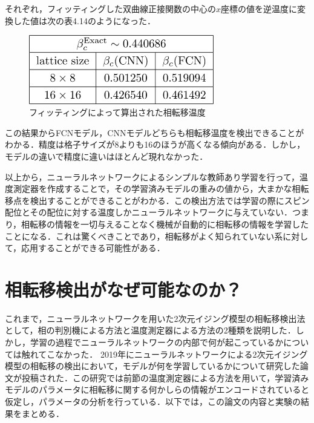\documentclass[a4paper,11pt]{jsreport}
\begin{document}
それぞれ，フィッティングした双曲線正接関数の中心の$x$座標の値を逆温度に変換した値は次の表4.14のようになった．
\begin{figure}[H]
   \begin{center}
       \includegraphics[height=3cm]{image/温度測定器検出結果.png}
       \caption{フィッティングによって算出された相転移温度}
   \end{center}
\end{figure}
この結果からFCNモデル，CNNモデルどちらも相転移温度を検出できることがわかる．精度は格子サイズが8よりも16のほうが高くなる傾向がある．しかし，モデルの違いで精度に違いはほとんど現れなかった．\par
以上から，ニューラルネットワークによるシンプルな教師あり学習を行って，温度測定器を作成することで，その学習済みモデルの重みの値から，大まかな相転移点を検出することができることがわかる．この検出方法では学習の際にスピン配位とその配位に対する温度しかニューラルネットワークに与えていない．つまり，相転移の情報を一切与えることなく機械が自動的に相転移の情報を学習したことになる．これは驚くべきことであり，相転移がよく知られていない系に対して，応用することができる可能性がある．

\section{相転移検出がなぜ可能なのか？}
これまで，ニューラルネットワークを用いた2次元イジング模型の相転移検出法として，相の判別機による方法と温度測定器による方法の2種類を説明した．しかし，学習の過程でニューラルネットワークの内部で何が起こっているかについては触れてこなかった．
2019年にニューラルネットワークによる2次元イジング模型の相転移の検出において，モデルが何を学習しているかについて研究した論文が投稿された\cite{10.1093/ptep/ptz082}．この研究では前節の温度測定器による方法を用いて，学習済みモデルのパラメータに相転移に関する何かしらの情報がエンコードされていると仮定し，パラメータの分析を行っている．以下では，この論文の内容と実験の結果をまとめる．
\end{document}
